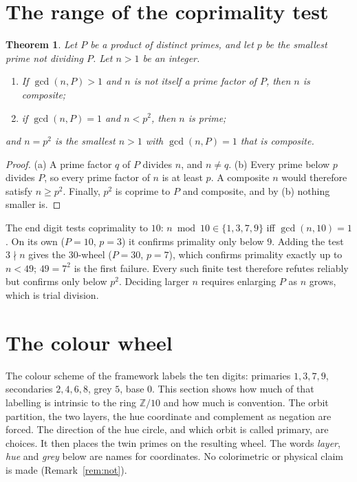 \documentclass[11pt]{article}
\newcommand{\Z}{\mathbb Z}
\theoremstyle{plain}
\newtheorem{theorem}{Theorem}
\theoremstyle{definition}
\theoremstyle{remark}
\begin{document}
\section{The range of the coprimality test}

\begin{theorem}\label{thm:range}
Let $P$ be a product of distinct primes, and let $p$ be the smallest prime not dividing $P$. Let
$n>1$ be an integer.
\begin{enumerate}[nosep]
\item[(a)] If $\gcd(n,P)>1$ and $n$ is not itself a prime factor of $P$, then $n$ is composite;
\item[(b)] if $\gcd(n,P)=1$ and $n<p^2$, then $n$ is prime;
\end{enumerate}
and $n=p^2$ is the smallest $n>1$ with $\gcd(n,P)=1$ that is composite.
\end{theorem}
\begin{proof}
(a) A prime factor $q$ of $P$ divides $n$, and $n\ne q$. (b) Every prime below $p$ divides $P$, so
every prime factor of $n$ is at least $p$. A composite $n$ would therefore satisfy $n\ge p^2$.
Finally, $p^2$ is coprime to $P$ and composite, and by (b) nothing smaller is.
\end{proof}

\noindent
The end digit tests coprimality to $10$: $n\bmod10\in\{1,3,7,9\}$ iff $\gcd(n,10)=1$. On its own
($P=10$, $p=3$) it confirms primality only below $9$. Adding the test $3\nmid n$ gives the
$30$-wheel ($P=30$, $p=7$), which confirms primality exactly up to $n<49$; $49=7^2$ is the first
failure. Every such finite test therefore refutes reliably but confirms only below $p^2$. Deciding
larger $n$ requires enlarging $P$ as $n$ grows, which is trial division.

\section{The colour wheel}

The colour scheme of the framework labels the ten digits: primaries $1,3,7,9$, secondaries
$2,4,6,8$, grey $5$, base $0$. This section shows how much of that labelling is intrinsic to the ring $\Z/10$
and how much is convention. The orbit partition, the two layers, the hue coordinate and complement
as negation are forced. The direction of the hue circle, and which orbit is called primary, are
choices. It then places the twin primes on the resulting wheel.
The words \emph{layer}, \emph{hue} and \emph{grey} below are names for coordinates. No colorimetric
or physical claim is made (Remark~\ref{rem:not}).
\end{document}
